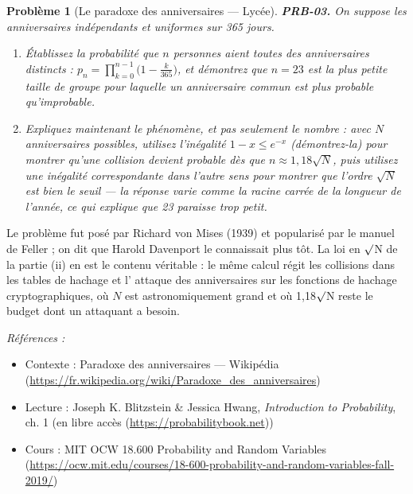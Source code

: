 \documentclass[11pt]{article}
\newtheorem{problem}{Problème}
\newenvironment{refs}{\par\small\noindent\emph{Références :}\begin{itemize}\setlength\itemsep{0pt}}{\end{itemize}\normalsize}
\begin{document}
\bigskip

\begin{problem}[{Le paradoxe des anniversaires --- Lycée}]
\textbf{PRB-03.} On suppose les anniversaires indépendants et uniformes sur
365 jours.
\begin{enumerate}
\item[(i)] Établissez la probabilité que $ n $ personnes aient toutes des anniversaires distincts :
$ p_n = \prod_{k=0}^{n-1} \big(1 - \frac{k}{365}\big) $, et démontrez que $ n = 23 $ est la
plus petite taille de groupe pour laquelle un anniversaire commun est plus probable
qu'improbable.
\item[(ii)] Expliquez maintenant le phénomène, et pas seulement le nombre : avec $ N $ anniversaires
possibles, utilisez l'inégalité $ 1 - x \le e^{-x} $ (démontrez-la) pour montrer qu'une
collision devient probable dès que $ n \approx 1{,}18\sqrt{N} $, puis utilisez une inégalité
correspondante dans l'autre sens pour montrer que l'ordre $ \sqrt{N} $ est bien le seuil --- la
réponse varie comme la racine carrée de la longueur de l'année, ce qui explique que 23 paraisse
trop petit.
\end{enumerate}

\end{problem}

\noindent Le problème fut posé par Richard von Mises (1939) et popularisé par le manuel
de Feller ; on dit que Harold Davenport le connaissait plus tôt. La loi en $\surd$N de la partie (ii)
en est le contenu véritable : le même calcul régit les collisions dans les tables de hachage et
l'\og{} attaque des anniversaires \fg{} sur les fonctions de hachage cryptographiques, où $ N $ est
astronomiquement grand et où 1,18$\surd$N reste le budget dont un attaquant a besoin.

\begin{refs}
\item Contexte : Paradoxe des anniversaires --- Wikipédia (\url{https://fr.wikipedia.org/wiki/Paradoxe_des_anniversaires})
\item Lecture : Joseph K. Blitzstein \& Jessica Hwang, \textit{Introduction to Probability}, ch. 1 (en libre accès (\url{https://probabilitybook.net}))
\item Cours : MIT OCW 18.600 Probability and Random Variables (\url{https://ocw.mit.edu/courses/18-600-probability-and-random-variables-fall-2019/})
\end{refs}

\bigskip
\end{document}
